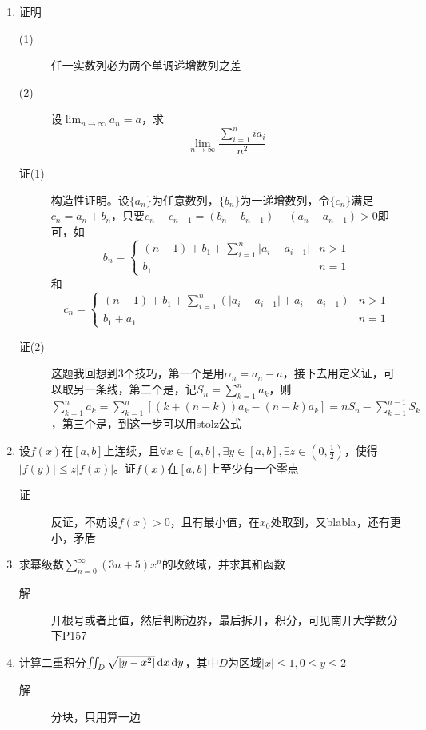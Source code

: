 \begin{enumerate}
\item 证明
\begin{description}
\item[(1)] 任一实数列必为两个单调递增数列之差
\item[(2)] 设$\lim_{n \to \infty}a_n =a$，求
\[
\lim_{n \to \infty} \frac{\sum_{i=1}^nia_i}{n^2}
\]
\item[证(1)] 构造性证明。设$\{a_n\}$为任意数列，$\{b_n\}$为一递增数列，令$\{c_n\}$满足$c_n=a_n+b_n$，只要$c_n-c_{n-1}=(b_n-b_{n-1})+(a_n-a_{n-1})>0$即可，如
\[
b_n=
\begin{cases}
(n-1)+b_1+\sum_{i=1}^n|a_i-a_{i-1}| & n>1\\
b_1& n=1
\end{cases}
\]
和
\[
c_n=
\begin{cases}
(n-1)+b_1+\sum_{i=1}^n(|a_i-a_{i-1}|+a_i-a_{i-1}) & n>1\\
b_1+a_1 & n=1
\end{cases}
\]
\item[证(2)] 这题我回想到3个技巧，第一个是用$\alpha_n = a_n - a$，接下去用定义证，可以取另一条线，第二个是，记$S_n=\sum_{k=1}^na_k$，则$\sum_{k=1}^na_k=\sum_{k=1}^n[(k+(n-k))a_k-(n-k)a_k]=nS_n-\sum_{k=1}^{n-1}S_k$，第三个是，到这一步可以用stolz公式
\end{description}

\item 设$f(x)$在$[a,b]$上连续，且$\forall x \in [a,b],\exists y \in [a,b],\exists z \in (0,\frac{1}{2})$，使得$|f(y)|\leq z|f(x)|$。证$f(x)$在$[a,b]$上至少有一个零点
\begin{description}
\item[证] 反证，不妨设$f(x)>0$，且有最小值，在$x_0$处取到，又blabla，还有更小，矛盾
\end{description}

\item 求幂级数$\sum_{n=0}^{\infty}(3n+5)x^n$的收敛域，并求其和函数
\begin{description}
\item[解] 开根号或者比值，然后判断边界，最后拆开，积分，可见南开大学数分下P157
\end{description}

\item 计算二重积分$\iint_D\sqrt{|y-x^2|}\,\mathrm{d} x\,\mathrm{d} y$，其中$D$为区域$|x|\leq 1,0\leq y \leq 2$
\begin{description}
\item[解] 分块，只用算一边
\end{description}


\end{enumerate}

